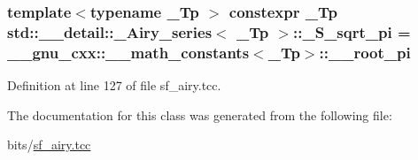 \subsubsection[{\texorpdfstring{\+\_\+\+S\+\_\+sqrt\+\_\+pi}{_S_sqrt_pi}}]{\setlength{\rightskip}{0pt plus 5cm}template$<$typename \+\_\+\+Tp $>$ constexpr \+\_\+\+Tp {\bf std\+::\+\_\+\+\_\+detail\+::\+\_\+\+Airy\+\_\+series}$<$ \+\_\+\+Tp $>$\+::\+\_\+\+S\+\_\+sqrt\+\_\+pi = \+\_\+\+\_\+gnu\+\_\+cxx\+::\+\_\+\+\_\+math\+\_\+constants$<$\+\_\+\+Tp$>$\+::\+\_\+\+\_\+root\+\_\+pi\hspace{0.3cm}{\ttfamily [static]}}\hypertarget{classstd_1_1____detail_1_1__Airy__series_a3fd1fba37ef8beb0d89854d4e58b8a38}{}\label{classstd_1_1____detail_1_1__Airy__series_a3fd1fba37ef8beb0d89854d4e58b8a38}


Definition at line 127 of file sf\+\_\+airy.\+tcc.



The documentation for this class was generated from the following file\+:\begin{DoxyCompactItemize}
\item 
bits/\hyperlink{sf__airy_8tcc}{sf\+\_\+airy.\+tcc}\end{DoxyCompactItemize}
